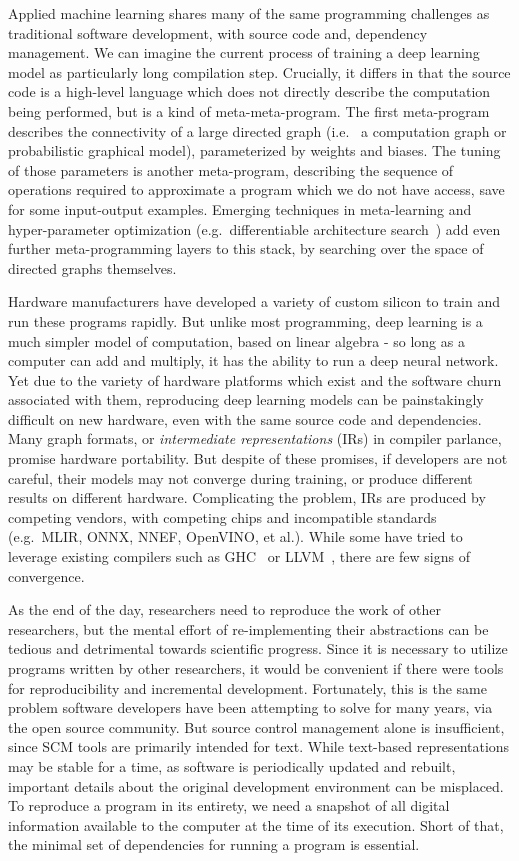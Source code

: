 \documentclass[12pt,initial,twoside,maitrise]{dms}
\numberwithin{equation}{section}
\numberwithin{table}{chapter}
\numberwithin{figure}{chapter}
\begin{document}
Applied machine learning shares many of the same programming challenges as traditional software development, with source code and, dependency management. We can imagine the current process of training a deep learning model as particularly long compilation step. Crucially, it differs in that the source code is a high-level language which does not directly describe the computation being performed, but is a kind of meta-meta-program. The first meta-program describes the connectivity of a large directed graph (i.e.~ a computation graph or probabilistic graphical model), parameterized by weights and biases. The tuning of those parameters is another meta-program, describing the sequence of operations required to approximate a program which we do not have access, save for some input-output examples. Emerging techniques in meta-learning and hyper-parameter optimization (e.g.~differentiable architecture search~\cite{liu2018darts}) add even further meta-programming layers to this stack, by searching over the space of directed graphs themselves.

Hardware manufacturers have developed a variety of custom silicon to train and run these programs rapidly. But unlike most programming, deep learning is a much simpler model of computation, based on linear algebra - so long as a computer can add and multiply, it has the ability to run a deep neural network. Yet due to the variety of hardware platforms which exist and the software churn associated with them, reproducing deep learning models can be painstakingly difficult on new hardware, even with the same source code and dependencies. Many graph formats, or \textit{intermediate representations} (IRs) in compiler parlance, promise hardware portability. But despite of these promises, if developers are not careful, their models may not converge during training, or produce different results on different hardware. Complicating the problem, IRs are produced by competing vendors, with competing chips and incompatible standards (e.g.~MLIR, ONNX, NNEF, OpenVINO, et al.). While some have tried to leverage existing compilers such as GHC~\cite{elliott2018simple} or LLVM~\cite{wei2017dlvm}, there are few signs of convergence.

As the end of the day, researchers need to reproduce the work of other researchers, but the mental effort of re-implementing their abstractions can be tedious and detrimental towards scientific progress. Since it is necessary to utilize programs written by other researchers, it would be convenient if there were tools for reproducibility and incremental development. Fortunately, this is the same problem software developers have been attempting to solve for many years, via the open source community. But source control management alone is insufficient, since SCM tools are primarily intended for text. While text-based representations may be stable for a time, as software is periodically updated and rebuilt, important details about the original development environment can be misplaced. To reproduce a program in its entirety, we need a snapshot of all digital information available to the computer at the time of its execution. Short of that, the minimal set of dependencies for running a program is essential.
\end{document}
